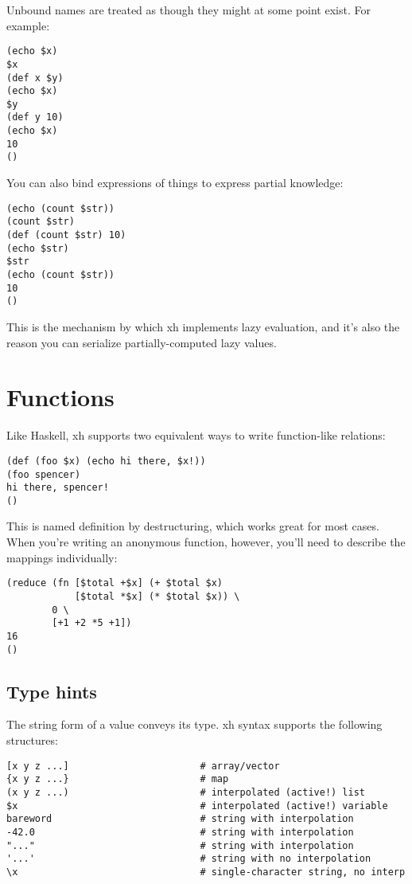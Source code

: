 \documentclass{report}
\begin{document}
  Unbound names are treated as though they might at some point exist. For
  example:

\begin{verbatim}
(echo $x)
$x
(def x $y)
(echo $x)
$y
(def y 10)
(echo $x)
10
()
\end{verbatim}

  You can also bind expressions of things to express partial knowledge:

\begin{verbatim}
(echo (count $str))
(count $str)
(def (count $str) 10)
(echo $str)
$str
(echo (count $str))
10
()
\end{verbatim}

  This is the mechanism by which xh implements lazy evaluation, and it's also
  the reason you can serialize partially-computed lazy values.

\chapter{Functions}\label{chp:functions}
  Like Haskell, xh supports two equivalent ways to write function-like
  relations:

\begin{verbatim}
(def (foo $x) (echo hi there, $x!))
(foo spencer)
hi there, spencer!
()
\end{verbatim}

  This is named definition by destructuring, which works great for most cases.
  When you're writing an anonymous function, however, you'll need to describe
  the mappings individually:

\begin{verbatim}
(reduce (fn [$total +$x] (+ $total $x)
            [$total *$x] (* $total $x)) \
        0 \
        [+1 +2 *5 +1])
16
()
\end{verbatim}

\section{Type hints}\label{sec:type-hints}
    The string form of a value conveys its type. xh syntax supports the
    following structures:

\begin{verbatim}
[x y z ...]                       # array/vector
{x y z ...}                       # map
(x y z ...)                       # interpolated (active!) list
$x                                # interpolated (active!) variable
bareword                          # string with interpolation
-42.0                             # string with interpolation
"..."                             # string with interpolation
'...'                             # string with no interpolation
\x                                # single-character string, no interp
\end{verbatim}
\end{document}
